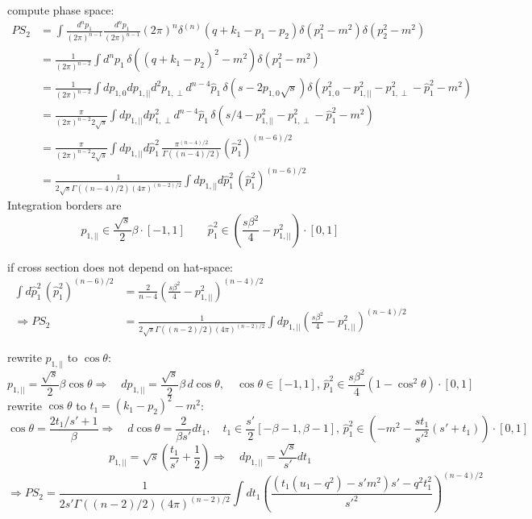 \documentclass[
  english,		%
  a4paper,		%
  11pt,			%
  DIV=12,
  titlepage,
  toc=bibnumbered,
  parskip=full,  	%
  headings=normal,
  BCOR=12mm,
  numbers=noenddot
]{scrartcl}
\begin{document}
compute phase space:
\begin{align}
PS_2 &= \int\!\!\frac{d^np_1}{(2\pi)^{n-1}}\frac{d^np_1}{(2\pi)^{n-1}} (2\pi)^n\delta^{(n)}(q+k_1-p_1-p_2)\delta(p_1^2-m^2)\delta(p_2^2 - m^2)\\
 &= \frac 1 {(2\pi)^{n-2}}\int\!\!d^np_1\,\delta((q+k_1-p_2)^2 -m^2) \delta(p_1^2-m^2)\\
 &= \frac 1 {(2\pi)^{n-2}}\int\!\!dp_{1,0}dp_{1,||}d^2p_{1,\perp}d^{n-4}\hat p_1\,\delta(s-2p_{1,0}\sqrt s) \delta(p_{1,0}^2-p_{1,||}^2 - p_{1,\perp}^2 - \hat p_1^2-m^2)\\
 &= \frac \pi {(2\pi)^{n-2} 2\sqrt s}\int\!\!dp_{1,||}dp^2_{1,\perp}d^{n-4}\hat p_1\,\delta(s/4-p_{1,||}^2 - p_{1,\perp}^2 - \hat p_1^2-m^2)\\
 &= \frac \pi {(2\pi)^{n-2} 2\sqrt s}\int\!\!dp_{1,||}d\hat p_1^2\,\frac{\pi^{(n-4)/2}}{\Gamma((n-4)/2)}(\hat p_1^2)^{(n-6)/2}\\
 &= \frac 1 {2\sqrt s\Gamma((n-4)/2)(4\pi)^{(n-2)/2}}\int\!\!dp_{1,||}d\hat p_1^2\,(\hat p_1^2)^{(n-6)/2}
\end{align}
Integration borders are
\begin{equation}
p_{1,||} \in \frac {\sqrt s} 2\beta \cdot [-1,1] \qquad \hat p_1^2 \in \left(\frac{s \beta^2}{4}-p_{1,||}^2\right)\cdot [0,1]
\end{equation}

if cross section does not depend on hat-space:
\begin{align}
\int\!\!d\hat p_1^2\,(\hat p_1^2)^{(n-6)/2} &= \frac 2 {n-4}\left(\frac{s \beta^2}{4}-p_{1,||}^2\right)^{(n-4)/2}\\
\Rightarrow PS_2 &= \frac 1 {2\sqrt s\Gamma((n-2)/2)(4\pi)^{(n-2)/2}}\int\!\!dp_{1,||}\left(\frac{s \beta^2}{4}-p_{1,||}^2\right)^{(n-4)/2}
\end{align}

rewrite $p_{1,||}$ to $\cos\theta$:
\begin{equation}
p_{1,||} = \frac{\sqrt s} 2 \beta\cos\theta \Rightarrow\quad dp_{1,||} = \frac{\sqrt s} 2 \beta\,d\!\cos\theta,\quad \cos\theta\in[-1,1],\, \hat p_1^2 \in \frac{s \beta^2}{4}\left(1-\cos^2\theta\right)\cdot[0,1]
\end{equation}
rewrite $\cos\theta$ to $t_1 = (k_1-p_2)^2-m^2$:
\begin{equation}
\cos\theta = \frac{2t_1/s'+1}{\beta} \Rightarrow\quad d\!\cos\theta = \frac 2 {\beta s'} dt_1,\quad t_1\in \frac {s'} 2[-\beta -1,\beta -1],\, \hat p_1^2 \in (-m^2-\frac{st_1}{s'^2}(s'+t_1))\cdot[0,1]
\end{equation}
\begin{equation}
p_{1,||} = \sqrt s\left(\frac{t_1}{s'}+\frac{1} 2\right) \Rightarrow\quad  dp_{1,||} = \frac{\sqrt s}{s'} dt_1
\end{equation}
\begin{equation}
\Rightarrow PS_2 = \frac 1 {2s'\Gamma((n-2)/2)(4\pi)^{(n-2)/2}}\int\!\!dt_1\left(\frac{(t_1(u_1-q^2)-s'm^2)s' - q^2t_1^2}{s'^2}\right)^{(n-4)/2}
\end{equation}
\end{document}
